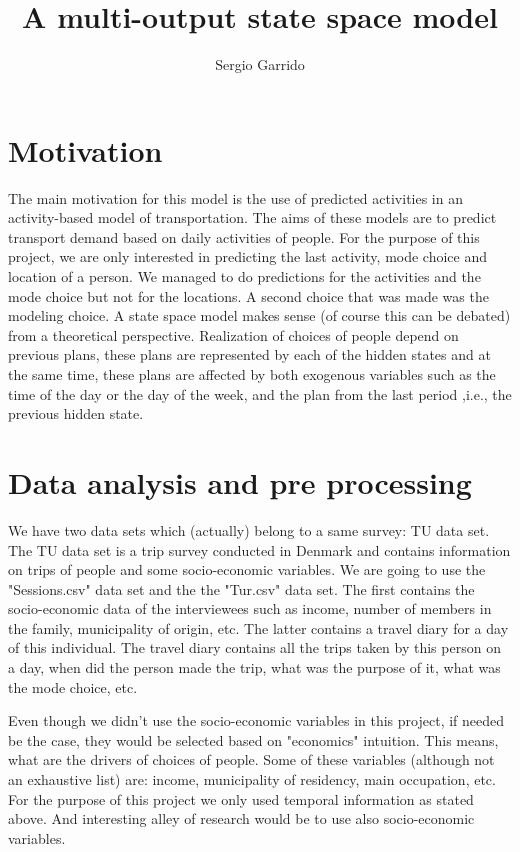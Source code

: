 \documentclass{article}
\title{A multi-output state space model}
\author{Sergio Garrido}
\begin{document}
\maketitle

\section{Motivation}
The main motivation for this model is the use of predicted activities in an activity-based model of transportation. The aims of these models are to predict transport demand based on daily activities of people. For the purpose of this project, we are only interested in predicting the last activity, mode choice and location of a person. We managed to do predictions for the activities and the mode choice but not for the locations. A second choice that was made was the modeling choice. A state space model makes sense (of course this can be debated) from a theoretical perspective. Realization of choices of people depend on previous plans, these plans are represented by each of the hidden states and at the same time, these plans are affected by both exogenous variables such as the time of the day or the day of the week, and the plan from the last period ,i.e., the previous hidden state. 

\section{Data analysis and pre processing}

We have two data sets which (actually) belong to a same survey: TU data set. The TU data set is a trip survey conducted in Denmark and contains information on trips of people and some socio-economic variables. We are going to use the "Sessions.csv" data set and the the "Tur.csv" data set. The first contains the socio-economic data of the interviewees such as income, number of members in the family, municipality of origin, etc. The latter contains a travel diary for a day of this individual. The travel diary contains all the trips taken by this person on a day, when did the person made the trip, what was the purpose of it, what was the mode choice, etc.

Even though we didn't use the socio-economic variables in this project, if needed be the case, they would be selected based on "economics" intuition. This means, what are the drivers of choices of people. Some of these variables (although not an exhaustive list) are: income, municipality of residency, main occupation, etc. For the purpose of this project we only used temporal information as stated above. And interesting alley of research would be to use also socio-economic variables. 
\end{document}
